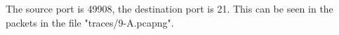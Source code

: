 The source port is 49908, the destination port is 21. This can be seen in the packets in the file "traces/9-A.pcapng".